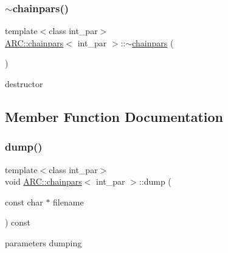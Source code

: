 \hypertarget{classARC_1_1chainpars_a297d217331fa2662d1e5e4471710a0f8}{}\label{classARC_1_1chainpars_a297d217331fa2662d1e5e4471710a0f8} 
\subsubsection{\texorpdfstring{$\sim$chainpars()}{~chainpars()}}
{\footnotesize\ttfamily template$<$class int\+\_\+par$>$ \\
\hyperlink{classARC_1_1chainpars}{A\+R\+C\+::chainpars}$<$ int\+\_\+par $>$\+::$\sim$\hyperlink{classARC_1_1chainpars}{chainpars} (\begin{DoxyParamCaption}{ }\end{DoxyParamCaption})\hspace{0.3cm}{\ttfamily [inline]}}



destructor 



\subsection{Member Function Documentation}
\hypertarget{classARC_1_1chainpars_ad9b13829dde6cee409f807c2237e5dbd}{}\label{classARC_1_1chainpars_ad9b13829dde6cee409f807c2237e5dbd} 
\subsubsection{\texorpdfstring{dump()}{dump()}}
{\footnotesize\ttfamily template$<$class int\+\_\+par$>$ \\
void \hyperlink{classARC_1_1chainpars}{A\+R\+C\+::chainpars}$<$ int\+\_\+par $>$\+::dump (\begin{DoxyParamCaption}\item[{const char $\ast$}]{filename }\end{DoxyParamCaption}) const\hspace{0.3cm}{\ttfamily [inline]}}



parameters dumping 

